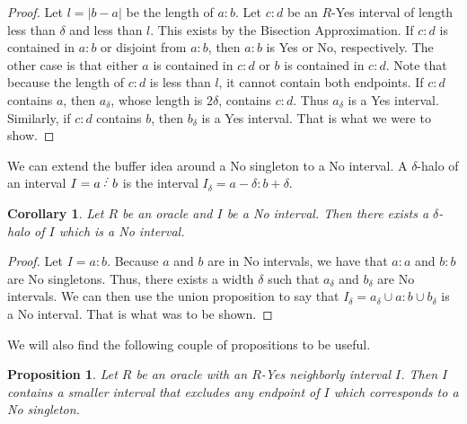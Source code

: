 \documentclass[12pt]{article}
\newtheorem{corollary}{Corollary}[subsection]
\newtheorem{proposition}{Proposition}[subsection]
\begin{document}
\begin{proof}
    Let $l=|b-a|$ be the length of $a:b$. Let $c:d$ be an $R$-Yes interval of length less than $\delta$ and less than $l$. This exists by the Bisection Approximation. If $c:d$ is contained in $a:b$ or disjoint from $a:b$, then $a:b$ is Yes or No, respectively. The other case is that either $a$ is contained in $c:d$ or $b$ is contained in $c:d$. Note that because the length of $c:d$ is less than $l$, it cannot contain both endpoints. If $c:d$ contains $a$, then $a_\delta$, whose length is $2 \delta$, contains $c:d$. Thus $a_\delta$ is a Yes interval. Similarly, if $c:d$ contains $b$, then $b_\delta$ is a Yes interval. That is what we were to show.
\end{proof}


We can extend the buffer idea around a No singleton to a No interval. A $\delta$-halo of an interval $I= a\lte b$ is the interval $I_\delta = a - \delta:b+\delta$.

\begin{corollary}\label{cor:halo-for-no}
    Let $R$ be an oracle and $I$ be a No interval. Then there exists a $\delta$-halo of $I$ which is a No interval. 
\end{corollary}

\begin{proof}
    Let $I = a:b$. Because $a$ and $b$ are in No intervals, we have that $a:a$ and $b:b$ are No singletons. Thus, there exists a width $\delta$ such that $a_\delta$ and $b_\delta$ are No intervals. We can then use the union proposition to say that $I_\delta = a_\delta \cup a:b \cup b_\delta$ is a No interval. That is what was to be shown. 
\end{proof}

We will also find the following couple of propositions to be useful. 

\begin{proposition}\label{pr:subinter}
Let $R$ be an oracle with an $R$-Yes neighborly interval $I$. Then $I$ contains a smaller interval that excludes any endpoint of $I$ which corresponds to a No singleton. 
\end{proposition}
\end{document}
